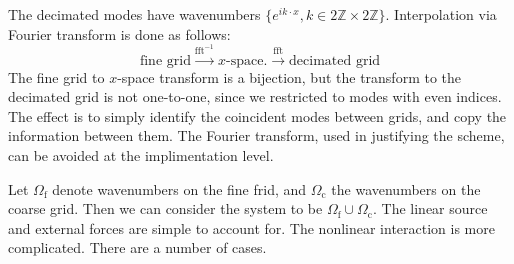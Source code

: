 \documentclass[10pt,showpacs,showkeys,%
amsfonts,amsmath,onecolumn,
floatfix,aps,superscriptaddress]{revtex4}
\begin{document}
The decimated modes have wavenumbers 
$\{e^{i k \cdot x}, k \in 2\mathbb{Z}\times2\mathbb{Z}\}$.
Interpolation via Fourier transform is done as follows:
\begin{dmath}
  \text{fine grid} \xrightarrow{\text{fft}^{-1}} x\text{-space}.
  \xrightarrow{\text{fft}} \text{decimated grid}
\end{dmath}
The fine grid to $x$-space transform is a bijection, but the transform
to the decimated grid is not one-to-one, since we restricted to modes
with even indices. The effect is to simply identify the coincident
modes between grids, and copy the information between them.  The
Fourier transform, used in justifying the scheme, can be avoided at
the implimentation level.

Let $\Omega_{\text{f}}$ denote wavenumbers on the fine frid, and
$\Omega_{\text{c}}$ the wavenumbers on the coarse grid. Then we can
consider the system to be $\Omega_{\text{f}} \cup \Omega_{\text{c}}$.
The linear source and external forces are simple to account for.
The nonlinear interaction is more complicated.  There are a number
of cases.
\end{document}
